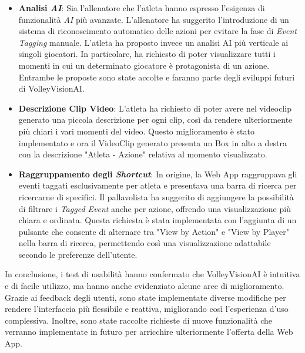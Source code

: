 \begin{itemize}
    \item \textbf{Analisi \textit{AI}}: Sia l'allenatore che l'atleta hanno espresso l'esigenza di funzionalità \textit{AI} più avanzate. L'allenatore ha suggerito l'introduzione di un sistema di riconoscimento automatico delle azioni per evitare la fase di \textit{Event Tagging} manuale. L'atleta ha proposto invece un analisi AI più verticale ai singoli giocatori. In particolare, ha richiesto di poter visualizzare tutti i momenti in cui un determinato giocatore è protagonista di un azione. Entrambe le proposte sono state accolte e faranno parte degli sviluppi futuri di VolleyVisionAI. 
    \item \textbf{Descrizione Clip Video}: L'atleta ha richiesto di poter avere nel videoclip generato una piccola descrizione per ogni clip, così da rendere ulteriormente più chiari i vari momenti del video. Questo miglioramento è stato implementato e ora il VideoClip generato presenta un Box in alto a destra con la descrizione "Atleta - Azione" relativa al momento visualizzato.
    \item \textbf{Raggruppamento degli \textit{Shortcut}}: In origine, la Web App raggruppava gli eventi taggati esclusivamente per atleta e presentava una barra di ricerca per ricercarne di specifici. Il pallavolista ha suggerito di aggiungere la possibilità di filtrare i \textit{Tagged Event} anche per azione, offrendo una visualizzazione più chiara e ordinata. Questa richiesta è stata implementata con l'aggiunta di un pulsante che consente di alternare tra "View by Action" e "View by Player" nella barra di ricerca, permettendo così una visualizzazione adattabile secondo le preferenze dell'utente.
\end{itemize}

In conclusione, i test di usabilità hanno confermato che VolleyVisionAI è intuitiva e di facile utilizzo, ma hanno anche evidenziato alcune aree di miglioramento. Grazie ai feedback degli utenti, sono state implementate diverse modifiche per rendere l'interfaccia più flessibile e reattiva, migliorando così l'esperienza d'uso complessiva. Inoltre, sono state raccolte richieste di nuove funzionalità che verranno implementate in futuro per arricchire ulteriormente l'offerta della Web App.
